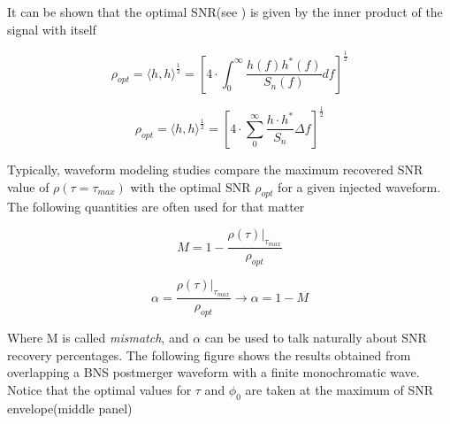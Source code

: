 It can be shown that the optimal SNR(see \cite[chapter 5]{Sathyaprakash:2009xs}) is given by the inner product of the signal with itself

\begin{equation}
\rho_{opt} = \langle h,h \rangle^{\frac{1}{2}} = \left[4\cdot\int_{0}^{\infty} \frac{h(f)h^{*}(f)}{S_n(f)}df\right]^{\frac{1}{2}}
\end{equation}

\begin{equation}\label{sopt}
\rho_{opt} = \langle h,h \rangle^{\frac{1}{2}} = \left[4\cdot\sum_{0}^{\infty} \frac{ h\cdot h^{*}}{S_n}\Delta f\right]^{\frac{1}{2}}
\end{equation}

Typically, waveform modeling studies compare the maximum recovered SNR value of $\rho(\tau=\tau_{max})$ with the optimal SNR $\rho_{opt}$ for a given injected waveform. The following quantities are often used for that matter 


\begin{equation}
M = 1-\frac{\rho(\tau)|_{\tau_{max}}}{\rho_{opt}}
\end{equation}

\begin{equation}
\alpha = \frac{\rho(\tau)|_{\tau_{max}}}{\rho_{opt}} \rightarrow \alpha = 1-M
\end{equation}

Where M is called \textit{mismatch}, and $\alpha$ can be used to talk naturally about SNR recovery percentages. The following figure shows the results obtained from overlapping a BNS postmerger waveform with a finite monochromatic wave. Notice that  the optimal values for $\tau$ and $\phi_0$ are taken at the maximum of SNR envelope(middle panel)



